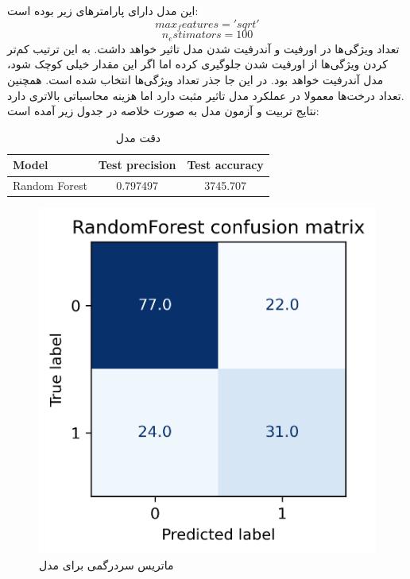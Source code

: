 \documentclass[11pt]{article}
\begin{document}
		\subsection{}
				این مدل دارای پارامترهای زیر بوده است:
		$$max_features = 'sqrt'$$
		$$n_estimators = 100$$
		تعداد ویژگی‌ها در اورفیت و آندرفیت شدن مدل تاثیر خواهد داشت. به این ترتیب کم‌تر کردن ویژگی‌ها از اورفیت شدن جلو‌گیری کرده اما اگر این مقدار خیلی کوچک شود، مدل آندرفیت خواهد بود. در این جا جذر تعداد ویژگی‌ها انتخاب شده است. همچنین تعداد درخت‌ها معمولا در عملکرد مدل تاثیر مثبت دارد اما هزینه محاسباتی بالاتری دارد.\\
		نتایج تربیت و آزمون مدل به صورت خلاصه در جدول زیر آمده است:
				\begin{table}[h!]
			\caption{دقت مدل }
			\begin{latin}
				\centering
				\begin{tabular}{|l|c|c|}
					\hline
					\textbf{Model} & \textbf{Test precision} & \textbf{Test accuracy} \\ \hline
					Random Forest & 0.797497 & 3745.707 \\ \hline
				\end{tabular}
			\end{latin}
			\label{tab:randomforest_results}
		\end{table}
		\begin{figure}[!h]
			\centerline{\includegraphics[width=0.5\linewidth]{../HW2_2/RandomForest confusion.png}}
			\caption{ماتریس سردرگمی برای مدل }
			\label{fig:confusion_randomforest}
		\end{figure}
		\pagebreak
\end{document}
